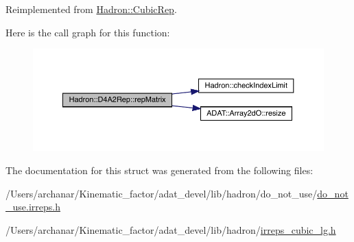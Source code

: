 Reimplemented from \mbox{\hyperlink{structHadron_1_1CubicRep_ac5d7e9e6f4ab1158b5fce3e4ad9e8005}{Hadron\+::\+Cubic\+Rep}}.

Here is the call graph for this function\+:
\nopagebreak
\begin{figure}[H]
\begin{center}
\leavevmode
\includegraphics[width=350pt]{d7/d66/structHadron_1_1D4A2Rep_a278dadc5305417dfc7dd7a8e1ae642d4_cgraph}
\end{center}
\end{figure}


The documentation for this struct was generated from the following files\+:\begin{DoxyCompactItemize}
\item 
/\+Users/archanar/\+Kinematic\+\_\+factor/adat\+\_\+devel/lib/hadron/do\+\_\+not\+\_\+use/\mbox{\hyperlink{do__not__use_8irreps_8h}{do\+\_\+not\+\_\+use.\+irreps.\+h}}\item 
/\+Users/archanar/\+Kinematic\+\_\+factor/adat\+\_\+devel/lib/hadron/\mbox{\hyperlink{lib_2hadron_2irreps__cubic__lg_8h}{irreps\+\_\+cubic\+\_\+lg.\+h}}\end{DoxyCompactItemize}
